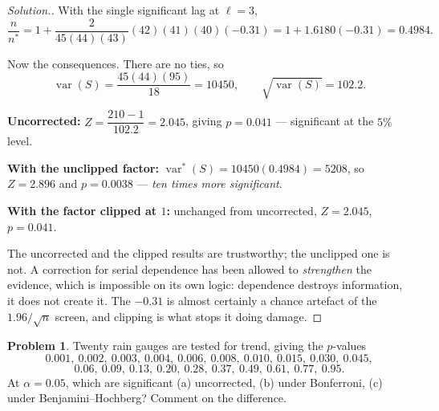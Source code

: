 \documentclass[11pt,a4paper]{article}
\theoremstyle{definition}
\newtheorem{problemx}{Problem}[section]
\newenvironment{problem}{\begin{problemx}}{\end{problemx}}
\newenvironment{solution}
  {\renewcommand{\qedsymbol}{}\begin{proof}[\textit{Solution}.]}
  {\end{proof}}
\begin{document}
\begin{solution}
With the single significant lag at $\ell = 3$,
$$\dfrac{n}{n^{*}} = 1 + \dfrac{2}{45(44)(43)}(42)(41)(40)(-0.31)
= 1 + 1.6180(-0.31) = 0.4984 .$$

Now the consequences. There are no ties, so
$$\operatorname{var}(S) = \dfrac{45(44)(95)}{18} = 10450,
\qquad \sqrt{\operatorname{var}(S)} = 102.2 .$$

\textbf{Uncorrected:} $Z = \dfrac{210 - 1}{102.2} = 2.045$, giving $p = 0.041$ ---
significant at the $5\%$ level.

\textbf{With the unclipped factor:}
$\operatorname{var}^{*}(S) = 10450(0.4984) = 5208$, so $Z = 2.896$ and
$p = 0.0038$ --- \emph{ten times more significant}.

\textbf{With the factor clipped at $1$:} unchanged from uncorrected,
$Z = 2.045$, $p = 0.041$.

The uncorrected and the clipped results are trustworthy; the unclipped one is
not. A correction for serial dependence has been allowed to \emph{strengthen} the
evidence, which is impossible on its own logic: dependence destroys information,
it does not create it. The $-0.31$ is almost certainly a chance artefact of the
$1.96/\sqrt{n}$ screen, and clipping is what stops it doing damage.
\end{solution}


\begin{problem}
Twenty rain gauges are tested for trend, giving the $p$-values
$$0.001,\ 0.002,\ 0.003,\ 0.004,\ 0.006,\ 0.008,\ 0.010,\ 0.015,\ 0.030,\ 0.045,$$
$$0.06,\ 0.09,\ 0.13,\ 0.20,\ 0.28,\ 0.37,\ 0.49,\ 0.61,\ 0.77,\ 0.95 .$$
At $\alpha = 0.05$, which are significant (a) uncorrected, (b) under Bonferroni,
(c) under Benjamini--Hochberg? Comment on the difference.
\end{problem}
\end{document}
